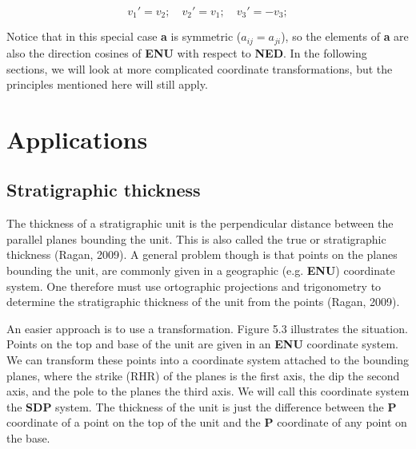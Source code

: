 \documentclass[a4paper , 12pt]{book}
\begin{document}
\begin{equation}
    v_1\text{$'$}=v_2;\quad v_2\text{$'$}=v_1; \quad v_3\text{$'$}=-v_3;
\end{equation}

Notice that in this special case \textbf{a} is symmetric ($a_{ij}=a_{ji}$), so the elements of \textbf{a} are also the direction cosines of  \textbf{ENU} with respect to \textbf{NED}. In the following sections, we will look at more complicated coordinate transformations, but the principles mentioned here will still apply.

\section{Applications}

\subsection{Stratigraphic thickness}

The thickness of a stratigraphic unit is the perpendicular distance between the parallel planes bounding the unit. This is also called the true or stratigraphic thickness (Ragan, 2009). A general problem though is that points on the planes bounding the unit, are commonly given in a geographic (e.g. \textbf{ENU}) coordinate system. One therefore must use ortographic projections and trigonometry to determine the stratigraphic thickness of the unit from the points (Ragan, 2009).

An easier approach is to use a transformation. Figure 5.3 illustrates the situation. Points on the top and base of the unit are given in an \textbf{ENU} coordinate system. We can transform these points into a coordinate system attached to the bounding planes, where the strike (RHR) of the planes is the first axis, the dip the second axis, and the pole to the planes the third axis. We will call this coordinate system the \textbf{SDP} system. The thickness of the unit is just the difference between the \textbf{P} coordinate of a point on the top of the unit and the \textbf{P} coordinate of any point on the base.
\end{document}
